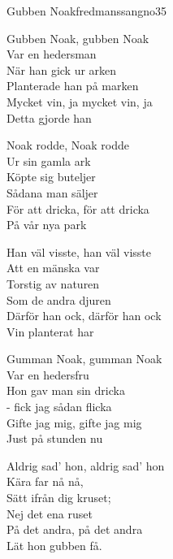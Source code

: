 \begin{song}{Gubben Noak}{fredmanssangno35}
\begin{vers}
Gubben Noak, gubben Noak\\
Var en hedersman\\
När han gick ur arken\\
Planterade han på marken\\
Mycket vin, ja mycket vin, ja\\
Detta gjorde han\\
\end{vers}
\begin{vers}
Noak rodde, Noak rodde\\
Ur sin gamla ark\\
Köpte sig buteljer\\
Sådana man säljer\\
För att dricka, för att dricka\\
På vår nya park\\
\end{vers}
\begin{vers}
Han väl visste, han väl visste\\
Att en mänska var\\
Torstig av naturen\\
Som de andra djuren\\
Därför han ock, därför han ock\\
Vin planterat har\\
\end{vers}
\begin{vers}
Gumman Noak, gumman Noak\\
Var en hedersfru\\
Hon gav man sin dricka\\
- fick jag sådan flicka\\
Gifte jag mig, gifte jag mig\\
Just på stunden nu\\
\end{vers}
\newp
\begin{vers}
Aldrig sad' hon, aldrig sad' hon\\
Kära far nå nå,\\
Sätt ifrån dig kruset;\\
Nej det ena ruset\\
På det andra, på det andra\\
Lät hon gubben få.\\    
\end{vers}
\begin{vers}

\end{vers}
\end{song}
